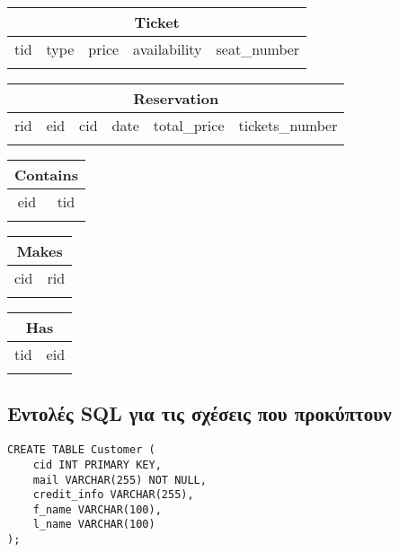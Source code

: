 \documentclass{article}
\begin{document}
\noindent
\begin{tabular}{|c|c|c|c|c|}
\hline
\multicolumn{5}{|c|}{Ticket} \\
\hline
tid & type & price & availability & seat\_number \\
\hline
& & & & \\
\hline
\end{tabular}

\vspace{10pt}

\noindent
\begin{tabular}{|c|c|c|c|c|c|}
\hline
\multicolumn{6}{|c|}{Reservation} \\
\hline
rid & eid & cid & date & total\_price & tickets\_number \\
\hline
& & & & & \\
\hline
\end{tabular}

\vspace{10pt}


\noindent
\begin{tabular}{|c|c|}
\hline
\multicolumn{2}{|c|}{Contains} \\
\hline
eid & tid \\
\hline
& \\
\hline
\end{tabular}

\vspace{5pt}

\noindent
\begin{tabular}{|c|c|}
\hline
\multicolumn{2}{|c|}{Makes} \\
\hline
cid & rid \\
\hline
& \\
\hline
\end{tabular}

\vspace{5pt}

\noindent
\begin{tabular}{|c|c|}
\hline
\multicolumn{2}{|c|}{Has} \\
\hline
tid & eid \\
\hline
& \\
\hline
\end{tabular}

\subsection*{Εντολές SQL για τις σχέσεις που προκύπτουν}
\begin{lstlisting}
CREATE TABLE Customer (
    cid INT PRIMARY KEY,
    mail VARCHAR(255) NOT NULL,
    credit_info VARCHAR(255),
    f_name VARCHAR(100),
    l_name VARCHAR(100)
);
\end{lstlisting}
\end{document}
